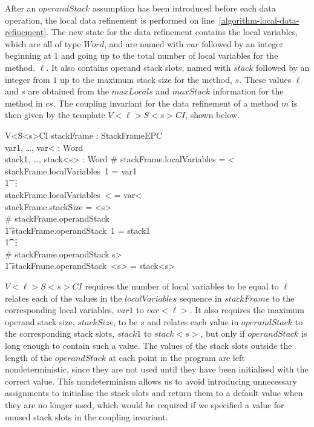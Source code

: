 After an $operandStack$ assumption has been introduced before each
data operation, the local data refinement is performed on
line~\ref{algorithm-local-data-refinement}.
The new state for the data refinement contains the local variables,
which are all of type $Word$, and are named with $var$ followed by an
integer beginning at $1$ and going up to the total number of local
variables for the method, $\ell$.
It also contains operand stack slots, named with $stack$ followed by
an integer from $1$ up to the maximum stack size for the method, $s$.
These values $\ell$ and $s$ are obtained from the $maxLocals$ and
$maxStack$ information for the  method in $cs$.
The coupling invariant for the data refinement of a method
$m$ is then given by the template $V{<}\ell{>}S{<}s{>}CI$, shown below.

\begin{schema}{V{<}\ell{>}S{<}s{>}CI}
  stackFrame : StackFrameEPC \\
  var1, \ldots, var{<}\ell{>} : Word \\
  stack1, \ldots, stack{<}s{>} : Word
\where
  \# stackFrame.localVariables = {<}\ell{>} \\
  stackFrame.localVariables~1 = var1 \\
  \t1 \vdots \\
  stackFrame.localVariables~{<}\ell{>} = var{<}\ell{>} \\
  stackFrame.stackSize = {<}s{>} \\
  \# stackFrame.operandStack  \implies \\
  \t1 stackFrame.operandStack~1 = stack1 \\
  \t1 \vdots \\
  \# stackFrame.operandStack \geq {<}s{>} \implies \\
  \t1 stackFrame.operandStack~{<}s{>} = stack{<}s{>}
\end{schema}

$V{<}\ell{>}S{<}s{>}CI$ requires the number of local variables to be
equal to $\ell$ relates each of the values in the $localVariables$
sequence in $stackFrame$ to the corresponding local variables, $var1$
to $var{<}\ell{>}$.
It also requires the maximum operand stack size, $stackSize$, to be
$s$ and relates each value in $operandStack$ to the corresponding
stack slots, $stack1$ to $stack{<}s{>}$, but only if $operandStack$ is
long enough to contain such a value.
The values of the stack slots outside the length of the $operandStack$
at each point in the program are left nondeterministic, since they are
not used until they have been initialised with the correct value.
This nondeterminism allows us to avoid introducing unnecessary
assignments to initialise the stack slots and return them to a default
value when they are no longer used, which would be required if we
specified a value for unused stack slots in the coupling invariant.

